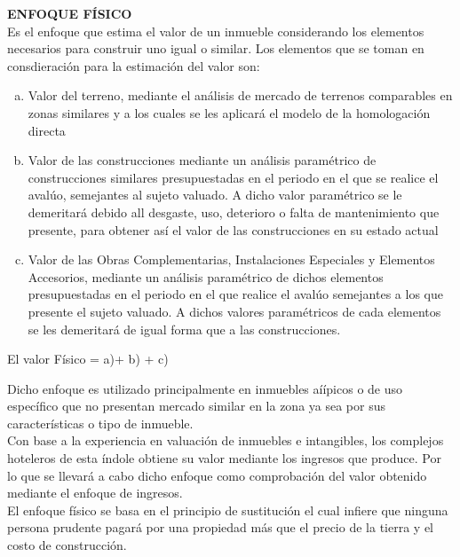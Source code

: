 \textcolor{principal}{\textbf{ENFOQUE F\'ISICO} }\\


Es el enfoque que estima el valor de un inmueble considerando los elementos necesarios para construir uno igual o similar. Los elementos que se toman en consdieraci\'on para la estimaci\'on del valor son: 

\begin{enumerate}[a)]

\item \textcolor{principal}{Valor del terreno}, mediante el análisis de mercado de terrenos comparables en zonas similares y a los cuales se les aplicar\'a el modelo de la homologaci\'on directa 

\item \textcolor{principal}{Valor de las construcciones} mediante un an\'alisis param\'etrico de construcciones similares presupuestadas en el periodo en el que se realice el aval\'uo, semejantes al sujeto valuado. A dicho valor param\'etrico se le demeritar\'a debido all desgaste, uso, deterioro o falta de mantenimiento que presente, para obtener as\'i el valor de las construcciones en su estado actual

\item \textcolor{principal}{Valor de las Obras Complementarias}, Instalaciones Especiales y Elementos Accesorios, mediante un an\'alisis param\'etrico de dichos elementos presupuestadas en el periodo en el que realice el aval\'uo semejantes a los que presente el sujeto valuado. A dichos valores param\'etricos de cada elementos se les demeritar\'a de igual forma que a las construcciones.

\end{enumerate}

\textcolor{principal}{El valor Físico = a)+ b) + c)}

Dicho enfoque es utilizado principalmente en inmuebles a\'iípicos o de uso espec\'ifico que no presentan mercado similar en la zona ya sea por sus caracter\'isticas o tipo de inmueble.\\

Con base a la experiencia en valuaci\'on de inmuebles e intangibles, los complejos hoteleros de esta \'indole obtiene su valor mediante los ingresos que produce. Por lo que se llevar\'a a cabo dicho enfoque como comprobaci\'on del valor obtenido mediante el enfoque de ingresos.\\

El enfoque f\'isico se basa en el principio de sustituci\'on el cual infiere que ninguna persona prudente pagar\'a por una propiedad m\'as que el precio de la tierra y el costo de construcci\'on.\\

